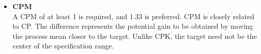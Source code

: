\documentclass[]{article}
\begin{document}
{\begin{itemize}
\item\textbf{ CPM}\\
A CPM of at least 1 is required, and 1.33 is preferred. CPM is closely related to CP. The difference represents the potential gain to be obtained by moving the process mean closer to the target. Unlike CPK, the target need not be the center of the specification range.
\end{itemize}
\newpage
}
\newpage
\end{document}
